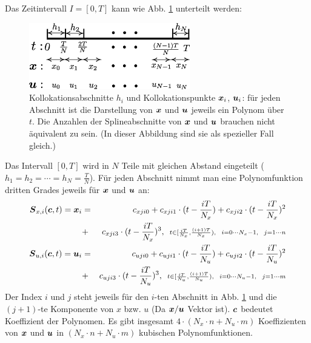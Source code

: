 Das Zeitintervall $I = [0,T] $ kann wie Abb. \ref{fig:Collocation} unterteilt werden:
\begin{figure}
	\centering
	\includegraphics[width=7cm]{bild/modul/Collocation.eps}
	\caption[Kollokationsabschnitte $h_{i}$ und Kollokationspunkte $\vect{x}_{i}$, $\vect{u}_{i}$.]{Kollokationsabschnitte $h_{i}$ und Kollokationspunkte $\vect{x}_{i}$, $\vect{u}_{i}$: für jeden Abschnitt ist die Darstellung von $\boldsymbol x$ und $\boldsymbol u$ jeweils ein Polynom über $t$. Die Anzahlen der Splineabschnitte von $\boldsymbol x$ und $\boldsymbol u$ brauchen nicht äquivalent zu sein. (In dieser Abbildung sind sie als spezieller Fall gleich.)}
	\label{fig:Collocation}
\end{figure} 
 
Das Intervall $[0,T]$ wird in $N$ Teile mit gleichen Abstand eingeteilt ($h_{1} = h_{2} = \cdots = h_{N} = \frac{T}{N}$). Für jeden Abschnitt nimmt man eine Polynomfunktion dritten Grades jeweils für $\boldsymbol x$ und $\boldsymbol u$ an:
\begin{eqnarray}
\boldsymbol S_{x,i}(\boldsymbol c,t) = \boldsymbol x_{i} &=& c_{xji0}+c_{xji1}\cdot (t-\frac{iT}{N_{x}}) + c_{xji2}\cdot (t-\frac{iT}{N_{x}})^{2} \notag\\&+& c_{xji3}\cdot (t-\frac{iT}{N_{x}})^{3}, ~~\scriptstyle{t\in [\frac{iT}{N_{x}}, \frac{(i+1)T}{N_{x}}),~~i= 0\cdots N_{x}-1, ~~j = 1\cdots n}\notag\\ 
\boldsymbol S_{u,i}(\boldsymbol c,t) = \boldsymbol u_{i} &=& c_{uji0}+c_{uji1}\cdot (t-\frac{iT}{N_{u}}) + c_{uji2}\cdot (t-\frac{iT}{N_{u}})^{2} \notag\\&+& c_{uji3}\cdot (t-\frac{iT}{N_{u}})^{3}, ~~\scriptstyle{t\in [\frac{iT}{N_{u}}, \frac{(i+1)T}{N_{u}} ),~~i= 0\cdots N_{u}-1, ~~j = 1\cdots m}
\label{eq:form_von_Polynom_u_und_x}
\end{eqnarray}
Der Index $i$ und $j$ steht jeweils für den $i$-ten Abschnitt in Abb. \ref{fig:Collocation} und die $(j+1)$-te Komponente von $x$ bzw. $u$ (Da $\boldsymbol x/\boldsymbol u$ Vektor ist). $\boldsymbol c$ bedeutet Koeffizient der Polynomen. Es gibt insgesamt $4\cdot (N_{x}\cdot n + N_{u}\cdot m)$ Koeffizienten von $\boldsymbol x$ und $\boldsymbol u$ in $(N_{x}\cdot n + N_{u}\cdot m)$ kubischen Polynomfunktionen. 
 
